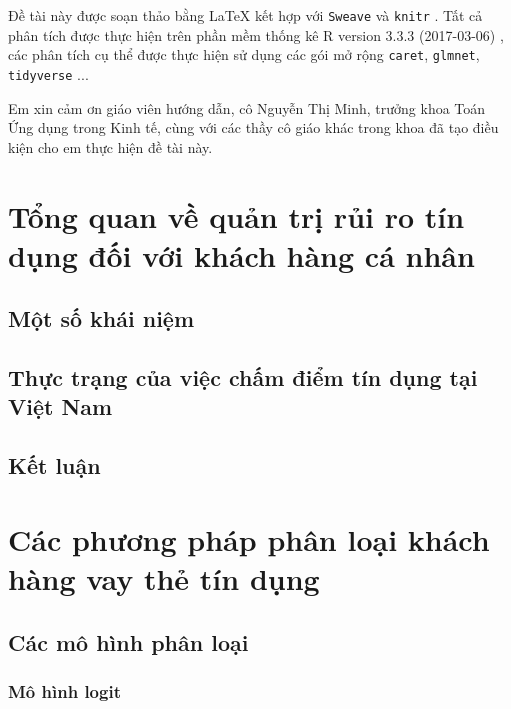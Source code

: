 \documentclass[a4paper]{report}\usepackage[]{graphicx}\usepackage[]{color}
\begin{document}
Đề tài này được soạn thảo bằng \LaTeX{} kết hợp với \texttt{Sweave} và \texttt{knitr} 
\parencite{r:knitr}. Tất cả phân tích được thực hiện trên phần mềm thống kê 
R version 3.3.3 (2017-03-06) \parencite{r:rbase},  
các phân tích cụ thể được thực hiện sử dụng các gói mở rộng \texttt{caret}\parencite{r:caret}, \texttt{glmnet}\parencite{r:glmnet}, \texttt{tidyverse} \parencite{r:tidyverse}... 

Em xin cảm ơn giáo viên hướng dẫn, cô Nguyễn Thị Minh, trưởng khoa 
Toán Ứng dụng trong Kinh tế, cùng với các thầy cô giáo khác trong khoa đã tạo điều kiện cho em thực hiện đề tài này.
\clearpage\tableofcontents
{}

\listoftables
{}

\listoffigures
{}

\chapter{Tổng quan về quản trị rủi ro tín dụng đối với khách hàng cá nhân}

\section{Một số khái niệm}

\section{Thực trạng của việc chấm điểm tín dụng tại Việt Nam}

\section{Kết luận}


\chapter{Các phương pháp phân loại khách hàng vay thẻ tín dụng}
\section{Các mô hình phân loại}

\subsection{Mô hình logit}
\end{document}
